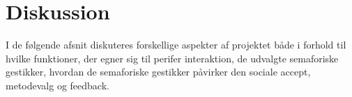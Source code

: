 \chapter{Diskussion}
\label{SamletDiskussion}
%
I de følgende afsnit diskuteres forskellige aspekter af projektet både i forhold til hvilke funktioner, der egner sig til perifer interaktion, de udvalgte semaforiske gestikker, hvordan de semaforiske gestikker påvirker den sociale accept, metodevalg og feedback. 



